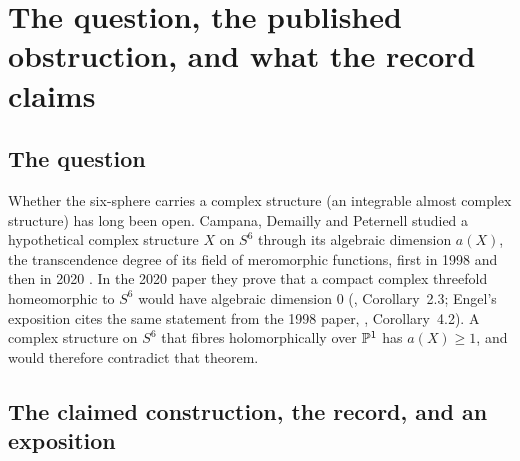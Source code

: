 \section{The question, the published obstruction, and what the record claims}\label{sec:problem}

\subsection{The question}

Whether the six-sphere carries a complex structure (an integrable almost complex structure) has long been open. Campana, Demailly and Peternell studied a hypothetical complex structure $X$ on $S^6$ through its algebraic dimension $a(X)$, the transcendence degree of its field of meromorphic functions, first in 1998 \cite{CDP98} and then in 2020 \cite{CDP20}. In the 2020 paper they prove that a compact complex threefold homeomorphic to $S^6$ would have algebraic dimension $0$ (\cite{CDP20}, Corollary~2.3; Engel's exposition cites the same statement from the 1998 paper, \cite{CDP98}, Corollary~4.2). A complex structure on $S^6$ that fibres holomorphically over $\mathbb{P}^1$ has $a(X)\ge1$, and would therefore contradict that theorem.

\subsection{The claimed construction, the record, and an exposition}

